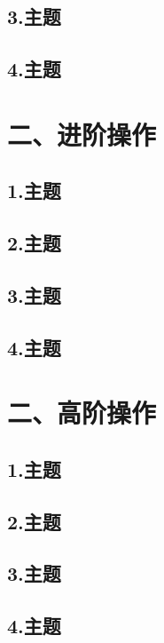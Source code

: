 \documentclass[12pt,aspectratio=169,mathserif]{beamer}
\begin{document}
\subsection{3.主题}
\subsection{4.主题}

\section{二、进阶操作}
\subsection{1.主题}
\subsection{2.主题}
\subsection{3.主题}
\subsection{4.主题}

\section{二、高阶操作}
\subsection{1.主题}
\subsection{2.主题}
\subsection{3.主题}
\subsection{4.主题}
\end{document}
